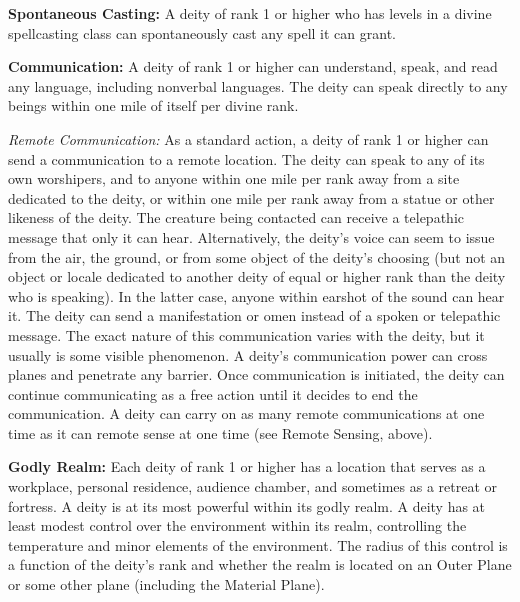 \documentclass{article}
\begin{document}
\vspace{12pt}
\textbf{Spontaneous Casting:} A deity of rank 1 or higher who has levels in a divine 
spellcasting class can spontaneously cast any spell it can grant. 

\vspace{12pt}
\textbf{Communication:} A deity of rank 1 or higher can understand, speak, and 
read any language, including nonverbal languages. The deity can speak directly 
to any beings within one mile of itself per divine rank.

\textit{Remote Communication: }As a standard action, a deity of rank 1 or higher 
can send a communication to a remote location. The deity can speak to any of its 
own worshipers, and to anyone within one mile per rank away from a site dedicated 
to the deity, or within one mile per rank away from a statue or other likeness 
of the deity. The creature being contacted can receive a telepathic message that 
only it can hear. Alternatively, the deity's voice can seem to issue from the air, 
the ground, or from some object of the deity's choosing (but not an object or locale 
dedicated to another deity of equal or higher rank than the deity who is speaking). 
In the latter case, anyone within earshot of the sound can hear it. The deity can 
send a manifestation or omen instead of a spoken or telepathic message. The exact 
nature of this communication varies with the deity, but it usually is some visible 
phenomenon. A deity's communication power can cross planes and penetrate any barrier. 
Once communication is initiated, the deity can continue communicating as a free 
action until it decides to end the communication. A deity can carry on as many 
remote communications at one time as it can remote sense at one time (see Remote 
Sensing, above).

\vspace{12pt}
\textbf{Godly Realm:} Each deity of rank 1 or higher has a location that serves 
as a workplace, personal residence, audience chamber, and sometimes as a retreat 
or fortress. A deity is at its most powerful within its godly realm. A deity has 
at least modest control over the environment within its realm, controlling the 
temperature and minor elements of the environment. The radius of this control is 
a function of the deity's rank and whether the realm is located on an Outer Plane 
or some other plane (including the Material Plane).
\end{document}
